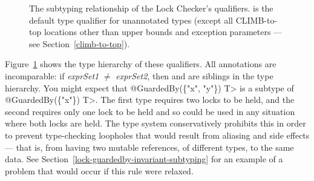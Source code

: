 \begin{figure}
\caption{The subtyping relationship of the Lock Checker's qualifiers.
 is the default type qualifier for unannotated
types (except all CLIMB-to-top locations other than upper bounds and exception
parameters --- see Section~\ref{climb-to-top}).
}
\label{fig-lock-guardedby-hierarchy}
\end{figure}

Figure~\ref{fig-lock-guardedby-hierarchy} shows the type hierarchy of these
qualifiers.
All  annotations are incomparable:
if \emph{exprSet1} $\neq$ \emph{exprSet2}, then  and
 are siblings in the type hierarchy.
You might expect that
\<@GuardedBy(\{"x", "y"\}) T> is a subtype of \<@GuardedBy(\{"x"\}) T>.  The
first type requires two locks to be held, and the second requires only one
lock to be held and so could be used in any situation where both locks are
held.  The type system conservatively prohibits this in order to prevent
type-checking loopholes that would result from aliasing and side effects
--- that is, from having two mutable references, of different types, to the
same data. See
Section~\ref{lock-guardedby-invariant-subtyping} for an example
of a problem that would occur if this rule were relaxed.




